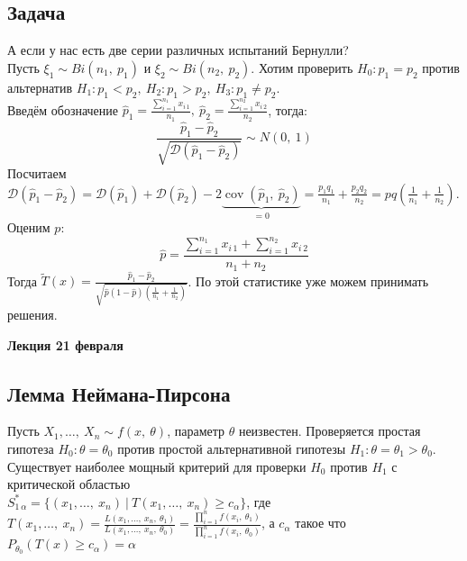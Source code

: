 \documentclass[12pt, a4paper]{article}
\newcommand{\dev}{\mathcal{D}}
\newcommand{\cov}{\operatorname{cov}}
\begin{document}
\subsection*{Задача}
А если у нас есть две серии различных испытаний Бернулли?\\
Пусть $\xi_1 \sim Bi(n_1,\ p_1)$ и $\xi_2 \sim Bi(n_2,\ p_2)$. Хотим проверить $H_0: p_1 = p_2$ против альтернатив $H_1: p_1 < p_2,\ H_2: p_1 > p_2,\ H_3: p_1 \neq p_2$.\\
Введём обозначение $\hat p_1 = \frac{\sum_{i = 1}^{n_1} x_{i\, 1} }{n_1},\ \hat p_2 = \frac{\sum_{i = 1}^{n_2} x_{i\, 2}}{n_2}$, тогда:
\[\frac{\hat p_1 - \hat p_2}{\sqrt{\dev (\hat p_1 - \hat p_2)}} \sim N(0,\ 1)\]
Посчитаем $\dev (\hat p_1 - \hat p_2) = \dev (\hat p_1) + \dev(\hat p_2) - 2\underset{=0}{\underbrace{\cov (\hat p_1,\ \hat p_2)}} =\frac{p_1 q_1}{n_1} + \frac{p_2 q_2}{n_2} = pq \left(\frac{1}{n_1} + \frac{1}{n_2}\right)$. \\
Оценим $p$:
\[\hat p = \frac{\sum\limits_{i = 1}^{n_1} x_{i\, 1} + \sum\limits_{i = 1}^{n_2} x_{i\, 2}}{n_1 + n_2}\]
Тогда $\tilde T(x) = \frac{\hat p_1 - \hat p_2}{\sqrt{\hat p (1 - \hat p)\left( \frac{1}{n_1} + \frac{1}{n_2} \right)}}$. По этой статистике уже можем принимать решения.

\begin{center}
\bf Лекция 21 февраля
\end{center}
\subsection*{Лемма Неймана-Пирсона}
Пусть $X_1,\dots,\ X_n \sim f(x,\ \theta)$, параметр $\theta$ неизвестен. Проверяется простая гипотеза $H_0: \theta = \theta_0$ против простой альтернативной гипотезы $H_1: \theta = \theta_1 > \theta_0$.\\
Существует наиболее мощный критерий для проверки $H_0$ против $H_1$ с критической областью\\
$\displaystyle S^*_{1\, \alpha} = \{(x_1,\dots,\ x_n)\ |\ T(x_1,\dots,\ x_n) \geq c_{\alpha}\}$, где $T(x_1,\dots,\ x_n) = \frac{L(x_1,\dots,\ x_n,\ \theta_1)}{L(x_1,\dots,\ x_n,\ \theta_0)} = \frac{\prod_{i = 1}^{n} f(x_i,\ \theta_1)}{\prod_{i = 1}^{n} f(x_i,\ \theta_0)}$, а $c_{\alpha}$ такое что $P_{\theta_0}(T(x) \geq c_{\alpha}) = \alpha$  
\end{document}
